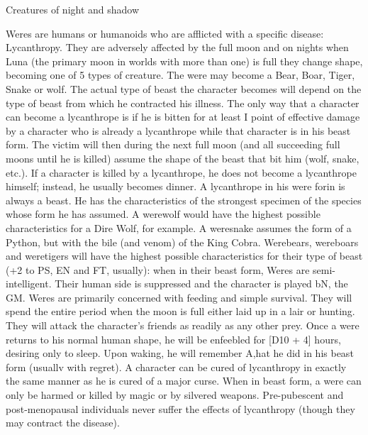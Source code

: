 \begin{mmgroup}{Creatures of night and shadow}
\begin{mmcomment}
 Weres are humans or humanoids who are afflicted with a
specific disease: Lycanthropy. They are adversely affected by the full
moon and on nights when Luna (the primary moon in worlds with more
than one) is full they change shape, becoming one of 5 types of
creature. The were may become a Bear, Boar, Tiger, Snake or wolf. The
actual type of beast the character becomes will depend on the type of
beast from which he contracted his illness. The only way that a
character can become a lycanthrope is if he is bitten for at least I
point of effective damage by a character who is already a lycanthrope
while that character is in his beast form. The victim will then during
the next full moon (and all succeeding full moons until he is killed)
assume the shape of the beast that bit him (wolf, snake, etc.). If a
character is killed by a lycanthrope, he does not become a lycanthrope
himself; instead, he usually becomes dinner.  A lycanthrope in his
were forin is always a beast. He has the characteristics of the
strongest specimen of the species whose form he has assumed. A
werewolf would have the highest possible characteristics for a Dire
Wolf, for example. A weresnake assumes the form of a Python, but with
the bile (and venom) of the King Cobra. Werebears, wereboars and
weretigers will have the highest possible characteristics for their
type of beast (+2 to PS, EN and FT, usually): when in their beast
form, Weres are semi-intelligent. Their human side is suppressed and
the character is played bN, the GM. Weres are primarily concerned
with feeding and simple survival. They will spend the entire period
when the moon is full either laid up in a lair or hunting. They will
attack the character's friends as readily as any other prey.  Once a
were returns to his normal human shape, he will be enfeebled for [D10 +
4] hours, desiring only to sleep. Upon waking, he will remember A,hat
he did in his beast form (usuallv with regret).  A character can be
cured of lycanthropy in exactly the same manner as he is cured of a
major curse.  When in beast form, a were can only be harmed or killed
by magic or by silvered weapons.  Pre-pubescent and post-menopausal
individuals never suffer the effects of lycanthropy (though they may
contract the disease).
\end{mmcomment}
\end{mmgroup}

